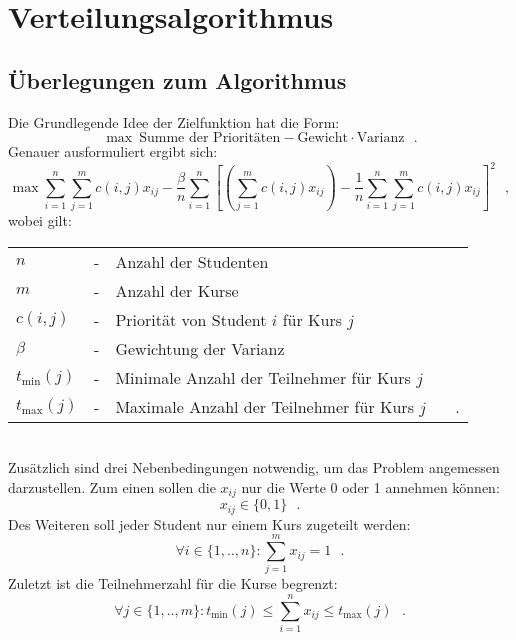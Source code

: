 \chapter{Verteilungsalgorithmus}
\label{chapter:algorithm}
    \section{Überlegungen zum Algorithmus}
            Die Grundlegende Idee der Zielfunktion hat die Form:
                $$ \max ~\text{Summe der Prioritäten} - \text{Gewicht} \cdot \text{Varianz} ~~~.$$
            Genauer ausformuliert ergibt sich:
                $$ \max 
                    \sum_{i=1}^{n} \sum_{j=1}^{m} c(i,j)x_{ij} 
                    - \frac{\beta}{n} \sum_{i=1}^{n}
                        \left[\left(\sum_{j=1}^{m} c(i,j)x_{ij}\right) - \frac{1}{n} \sum_{i=1}^{n} \sum_{j=1}^{m} c(i,j)x_{ij}\right]^2 ~~~,$$
            wobei gilt:\\
                \begin{tabular}{l c l}
                    $n$ & - & Anzahl der Studenten \\
                    $m$ & - & Anzahl der Kurse\\
                    $ c(i,j) $ & - & Priorität von Student $ i $ für Kurs $ j $\\
                    $ \beta $ & - & Gewichtung der Varianz\\
                    $t_{\min}(j)$ & - & Minimale Anzahl der Teilnehmer für Kurs $ j $\\
                    $t_{\max}(j)$ & - & Maximale Anzahl der Teilnehmer für Kurs $ j $ ~~~.\\
                \end{tabular}\\
            
            Zusätzlich sind drei Nebenbedingungen notwendig, um das Problem angemessen darzustellen.
            Zum einen sollen die $ x_{ij} $ nur die Werte 0 oder 1 annehmen können:
                $$ x_{ij} \in \{0,1\} ~~~.$$
            Des Weiteren soll jeder Student nur einem Kurs zugeteilt werden:
                $$ \forall {i \in \{1,..,n\}}: \sum_{j=1}^{m} x_{ij} = 1 ~~~.$$
            Zuletzt ist die Teilnehmerzahl für die Kurse begrenzt:
                $$ \forall {j \in \{1,..,m\}}: t_{\min}(j) \leq \sum_{i=1}^{n} x_{ij} \leq t_{\max}(j) ~~~.$$